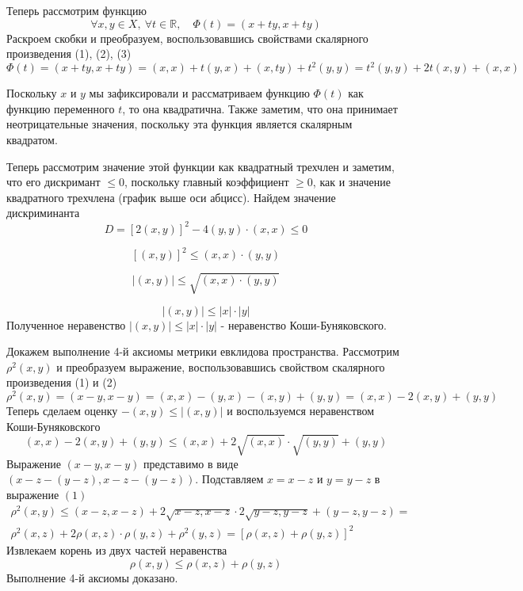 Теперь рассмотрим функцию 
$$
\forall x,y \in X, \ \forall t \in \mathbb {R}, \quad \Phi(t) = (x +ty, x + ty)
$$
Раскроем скобки и преобразуем, воспользовавшись свойствами скалярного произведения (1), (2), (3)
$$
\Phi(t) = (x +ty, x + ty) = (x, x) + t(y, x) + (x, ty) + t^2(y, y) = t^2(y, y) + 2t(x, y) + (x, x)
$$

Поскольку $x$ и $y$ мы зафиксировали и рассматриваем  функцию $\Phi(t)$ как функцию переменного $t$, то она квадратична. Также заметим, что она принимает неотрицательные значения, поскольку эта функция является скалярным квадратом.

Теперь рассмотрим значение этой функции как квадратный трехчлен и заметим, что его дискримант $\leq 0$, поскольку главный коэффициент $\geq 0$, как и значение квадратного трехчлена (график выше оси абцисс). Найдем значение дискриминанта 
$$
D = [2(x, y)]^2 - 4(y, y) \cdot (x, x) \leq 0
$$

$$
[(x, y)]^2 \leq (x, x) \cdot (y, y)
$$

$$
|(x, y)| \leq \sqrt{(x, x) \cdot (y, y)}
$$

$$
|(x, y)| \leq |x| \cdot |y|
$$
Полученное неравенство $|(x, y)| \leq |x| \cdot |y|$ - неравенство Коши-Буняковского.

Докажем выполнение 4-й аксиомы метрики евклидова пространства. Рассмотрим $\rho^2(x, y)$ и преобразуем выражение, воспользовавшись свойством скалярного произведения (1) и (2)
$$
\rho^2(x, y) = (x - y, x - y) = (x, x) - (y, x) - (x, y) + (y, y) = (x, x) - 2(x, y) + (y, y)
$$
Теперь сделаем оценку $-(x, y) \leq |(x, y)|$ и воспользуемся неравенством Коши-Буняковского
\begin{equation}
(x, x) - 2(x, y) + (y, y) \leq (x, x) + 2 \sqrt{(x, x)} \cdot \sqrt{(y, y)} + (y, y)
\end{equation}
Выражение $(x - y, x - y)$ представимо в виде $(x - z - (y - z), x - z - (y - z))$. Подставляем $x = x - z$ и $y = y - z$ в выражение $(1)$
\begin{equation*}
\begin{gathered}
\rho^2(x, y) \leq (x - z, x - z) + 2\sqrt{x - z, x - z} \cdot 2\sqrt{y - z, y - z} + (y - z, y - z) = \\
\rho^2(x, z) + 2\rho(x, z) \cdot \rho(y, z) + \rho^2(y, z) = [\rho(x, z) + \rho(y, z)]^2
\end{gathered}
\end{equation*}
Извлекаем корень из двух частей неравенства
$$
\rho(x, y) \leq \rho(x, z) + \rho(y, z)
$$
Выполнение 4-й аксиомы доказано.

